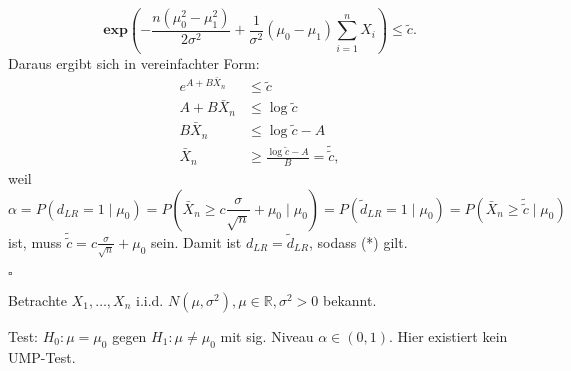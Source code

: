 \documentclass[10pt]{article}
\newcommand{\FZV}{X_1, \ldots, X_n} %
\newcommand{\IR}{\mathbb{R}} %
\newcommand{\sni}{\sum_{i=1}^{n}} %
\newcommand{\dlr}{d_{LR}}%
\newenvironment{BWS}[1][]
{\begin{Beweis}[frametitle=#1]}{\end{Beweis}}
\begin{document}
\begin{BWS}[Beweis 2.1.2 (UMP z-Test)]
			\begin{equation*}
				\textbf{exp}\left(-\frac{n(\mu_0^2-\mu_1^2)}{2 \sigma^2}+ \frac{1}{\sigma^2}(\mu_0 - \mu_1)\sni X_i\right) \leq \tilde{c}.
			\end{equation*}
			Daraus ergibt sich in vereinfachter Form:
			\begin{equation*}
				\begin{split}
					e^{A+B\bar{X}_n} &\leq \tilde{c}\\
					A+B\bar{X}_n &\leq \log\tilde{c}\\
					B \bar{X}_n &\leq \log\tilde{c} - A\\
					\bar{X}_n &\geq \frac{\log \tilde{c}-A}{B} = \tilde{\tilde{c}},
				\end{split}
			\end{equation*}
			weil
			\begin{equation*}
				\alpha = P(\dlr = 1 \mid \mu_0) = P\left(\bar{X}_n \geq c \frac{\sigma}{\sqrt{n}} + \mu_0 \mid \mu_0 \right) = P(\tilde{d}_{LR} = 1 \mid \mu_0) = P(\bar{X}_n \geq \tilde{\tilde{c}} \mid \mu_0)
			\end{equation*}
			ist, muss $\tilde{\tilde{c}} = c \frac{\sigma}{\sqrt{n}} + \mu_0$ sein. Damit ist $\dlr = \tilde{d}_{LR}$, sodass (*) gilt. 
			
			\begin{flushright}
				$\square$
			\end{flushright}
			\end{BWS}
			
			\begin{Korollar}
				Betrachte $\FZV$ i.i.d. $N(\mu, \sigma^2), \mu \in \IR, \sigma^2 >0$ bekannt. 
				
				Test: $H_0: \mu = \mu_0$ gegen $H_1: \mu \neq \mu_0$ mit sig. Niveau $\alpha \in (0,1)$. Hier existiert kein UMP-Test. 
			\end{Korollar}
			
\end{document}
